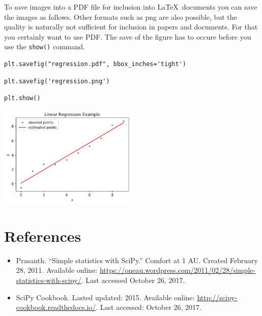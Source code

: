 To save images into a PDF file for inclusion into \LaTeX~documents you
can save the images as follows. Other formats such as png are also
possible, but the quality is naturally not sufficient for inclusion in
papers and documents. For that you certainly want to use PDF. The save
of the figure has to occure before you use the \verb|show()| command.

\begin{verbatim}
plt.savefig("regression.pdf", bbox_inches='tight')
\end{verbatim}

\begin{verbatim}
plt.savefig('regression.png') 
\end{verbatim}

\begin{verbatim}
plt.show()
\end{verbatim}

\begin{center}
\includegraphics[width=0.5\textwidth]{scipy/output_40_0.png}
\end{center}

\section{References}\label{references}

\begin{itemize}
\item
  Prasanth. ``Simple statistics with SciPy.'' Comfort at 1 AU. Created
  February 28, 2011. Available online:
  \url{https://oneau.wordpress.com/2011/02/28/simple-statistics-with-scipy/}.
  Last accessed October 26, 2017.
\item
  SciPy Cookbook. Lasted updated: 2015. Available online:
  \url{http://scipy-cookbook.readthedocs.io/}. Last accessed: October
  26, 2017.
\end{itemize}
